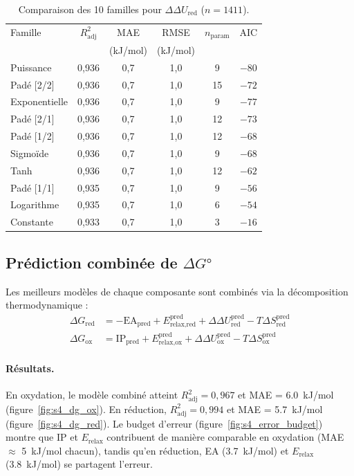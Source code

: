 \begin{table}[htbp]
\centering
\footnotesize
\caption{Comparaison des 10 familles pour $\Delta\Delta U_{\mathrm{red}}$ ($n = 1411$).}
\label{tab:s4_ddu_red_families}
\begin{tabular}{lccccc}
\toprule
Famille & $R^2_{\mathrm{adj}}$ & MAE & RMSE & $n_{\mathrm{param}}$ & AIC \\
 & & (kJ/mol) & (kJ/mol) & & \\
\midrule
Puissance & 0,936 & 0,7 & 1,0 & 9 & $-80$ \\
Padé [2/2] & 0,936 & 0,7 & 1,0 & 15 & $-72$ \\
Exponentielle & 0,936 & 0,7 & 1,0 & 9 & $-77$ \\
Padé [2/1] & 0,936 & 0,7 & 1,0 & 12 & $-73$ \\
Padé [1/2] & 0,936 & 0,7 & 1,0 & 12 & $-68$ \\
Sigmoïde & 0,936 & 0,7 & 1,0 & 9 & $-68$ \\
Tanh & 0,936 & 0,7 & 1,0 & 12 & $-62$ \\
Padé [1/1] & 0,935 & 0,7 & 1,0 & 9 & $-56$ \\
Logarithme & 0,935 & 0,7 & 1,0 & 6 & $-54$ \\
Constante & 0,933 & 0,7 & 1,0 & 3 & $-16$ \\
\bottomrule
\end{tabular}
\end{table}

\subsection{Prédiction combinée de \texorpdfstring{$\Delta G°$}{DG}}
\label{subsec:s4_dg}

Les meilleurs modèles de chaque composante sont combinés via la décomposition thermodynamique :
\begin{align}
    \Delta G_\text{red} &= -\text{EA}_\text{pred} + E_{\text{relax,red}}^{\text{pred}} + \Delta\Delta U_\text{red}^{\text{pred}} - T\Delta S_\text{red}^{\text{pred}} \\
    \Delta G_\text{ox}  &= \text{IP}_\text{pred} + E_{\text{relax,ox}}^{\text{pred}} + \Delta\Delta U_\text{ox}^{\text{pred}} - T\Delta S_\text{ox}^{\text{pred}}
\end{align}

\paragraph{Résultats.}
En oxydation, le modèle combiné atteint $R^2_\text{adj} = 0{,}967$ et MAE = \SI{6.0}{kJ/mol} (figure~\ref{fig:s4_dg_ox}). En réduction, $R^2_\text{adj} = 0{,}994$ et MAE = \SI{5.7}{kJ/mol} (figure~\ref{fig:s4_dg_red}). Le budget d'erreur (figure~\ref{fig:s4_error_budget}) montre que IP et $E_\text{relax}$ contribuent de manière comparable en oxydation (MAE $\approx$ \SI{5}{kJ/mol} chacun), tandis qu'en réduction, EA (\SI{3.7}{kJ/mol}) et $E_\text{relax}$ (\SI{3.8}{kJ/mol}) se partagent l'erreur.

